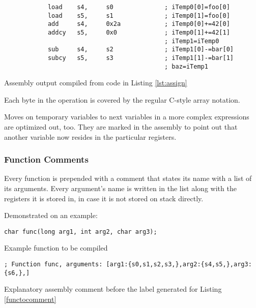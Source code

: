             \begin{listing}
            \centering
            \begin{verbatim}
            load    s4,     s0              ; iTemp0[0]=foo[0]
            load    s5,     s1              ; iTemp0[1]=foo[0]
            add     s4,     0x2a            ; iTemp0[0]+=42[0]
            addcy   s5,     0x0             ; iTemp0[1]+=42[1]
                                            ; iTemp1=iTemp0
            sub     s4,     s2              ; iTemp1[0]-=bar[0]
            subcy   s5,     s3              ; iTemp1[1]-=bar[1]
                                            ; baz=iTemp1
            \end{verbatim}
            \caption{Assembly output compiled from code in Listing \ref{lst:assign}}\label{lst:assignasm}
            \end{listing}

            Each byte in the operation is covered by the regular C-style array notation.

            Moves on temporary variables to next variables in a more complex expressions are optimized out, too. They are marked in the assembly to point out that another variable now resides in the particular registers.

            \subsubsection{Function Comments}

            Every function is prepended with a comment that states its name with a list of its arguments. Every argument's name is written in the list along with the registers it is stored in, in case it is not stored on stack directly.

            Demonstrated on an example:

            \begin{listing}
            \centering
            \texttt{char func(long arg1, int arg2, char arg3);}
            \caption{Example function to be compiled}\label{functocomment}
            \end{listing}

            \begin{listing}
            \centering
            \texttt{; Function func, arguments: [arg1:\{s0,s1,s2,s3,\},arg2:\{s4,s5,\},arg3:\{s6,\},]}
            \caption{Explanatory assembly comment before the label generated for Listing \ref{functocomment}}
            \end{listing}

